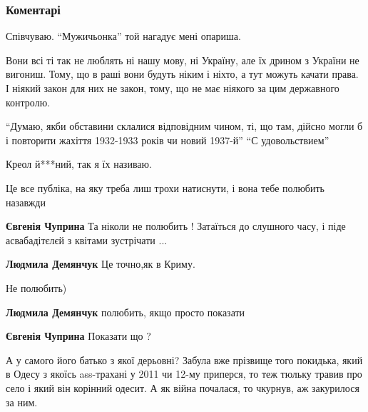  
 
 
 
 
\subsubsection{Коментарі}
\label{sec:30_11_2021.fb.bryhar_sergej.1.mova.cmt}

\begin{itemize} %
Співчуваю. \enquote{Мужичьонка} той нагадує мені опариша.


Вони всі ті так не люблять ні нашу мову, ні Україну, але їх дрином з України не
вигониш. Тому, що в раші вони будуть ніким і ніхто, а тут можуть качати права. І
ніякий закон для них не закон, тому, що не має ніякого за цим державного
контролю.



\enquote{Думаю, якби обставини склалися відповідним чином, ті, що там, дійсно могли б і
повторити жахіття 1932-1933 років чи новий 1937-й} 
\enquote{С удовольствием}

Креол й***ний, так я їх називаю.

Це все публіка, на яку треба лиш трохи натиснути, і вона тебе полюбить назавжди

\begin{itemize} %
\textbf{Євгенія Чуприна}
Та ніколи не полюбить !
Затаїться до слушного часу, і піде асвабадітєлєй з квітами зустрічати ...

\textbf{Людмила Демянчук} Це точно,як в Криму.

Не полюбить)

\textbf{Людмила Демянчук} полюбить, якщо просто показати

\textbf{Євгенія Чуприна}
Показати що ?
\end{itemize} %


А у самого його батько з якої дерьовні? Забула вже прізвище того покидька, який
в Одесу з якоїсь ass-трахані у 2011 чи 12-му приперся, то теж тюльку травив про
село і який він корінний одесит. А як війна почалася, то чкурнув, аж закурилося
за ним.



\end{itemize}
